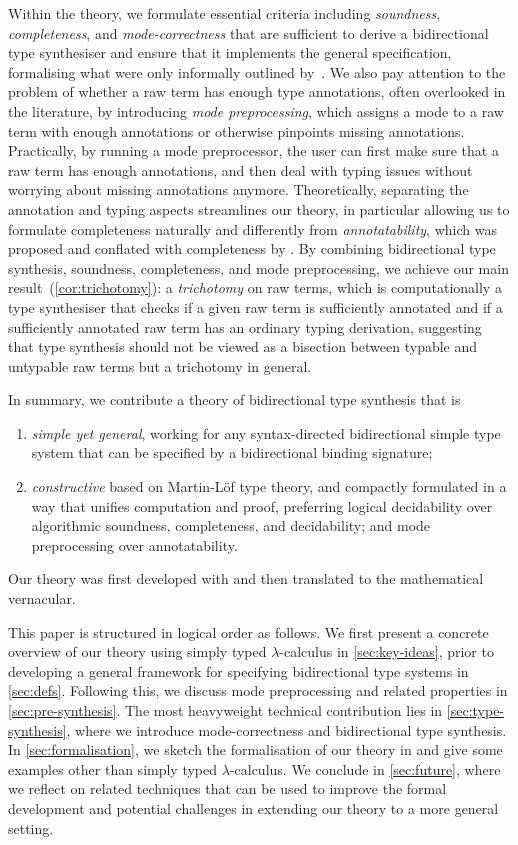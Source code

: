 Within the theory, we formulate essential criteria including \emph{soundness}, \emph{completeness}, and \emph{mode-correctness} that are sufficient to derive a bidirectional type synthesiser and ensure that it implements the general specification, formalising what were only informally outlined by~\citet{Dunfield2021}.
We also pay attention to the problem of whether a raw term has enough type annotations, often overlooked in the literature, by introducing \emph{mode preprocessing}, which assigns a mode to a raw term with enough annotations or otherwise pinpoints missing annotations.
Practically, by running a mode preprocessor, the user can first make sure that a raw term has enough annotations, and then deal with typing issues without worrying about missing annotations anymore.
Theoretically, separating the annotation and typing aspects streamlines our theory, in particular allowing us to formulate completeness naturally and differently from \emph{annotatability}, which was proposed and conflated with completeness by \citet{Dunfield2021}.
By combining bidirectional type synthesis, soundness, completeness, and mode preprocessing, we achieve our main result~(\cref{cor:trichotomy}): a \emph{trichotomy} on raw terms, which is computationally a type synthesiser that checks if a given raw term is sufficiently annotated and if a sufficiently annotated raw term has an ordinary typing derivation, suggesting that type synthesis should not be viewed as a bisection between typable and untypable raw terms but a trichotomy in general.

In summary, we contribute a theory of bidirectional type synthesis that is
\begin{enumerate}
  \item \emph{simple yet general}, working for any syntax-directed bidirectional simple type system that can be specified by a bidirectional binding signature;
  \item \emph{constructive} based on Martin-L\"of type theory, and compactly formulated in a way that unifies computation and proof, preferring logical decidability over algorithmic soundness, completeness, and decidability; and mode preprocessing over annotatability.
\end{enumerate}
Our theory was first developed with \Agda and then translated to the mathematical vernacular.

This paper is structured in logical order as follows.
We first present a concrete overview of our theory using simply typed $\lambda$-calculus in \cref{sec:key-ideas}, prior to developing a general framework for specifying bidirectional type systems in \cref{sec:defs}.
Following this, we discuss mode preprocessing and related properties in \cref{sec:pre-synthesis}.
The most heavyweight technical contribution lies in \cref{sec:type-synthesis}, where we introduce mode-correctness and bidirectional type synthesis.
In \cref{sec:formalisation}, we sketch the formalisation of our theory in \Agda and give some examples other than simply typed $\lambda$-calculus.
We conclude in \cref{sec:future}, where we reflect on related techniques that can be used to improve the formal development and potential challenges in extending our theory to a more general setting.

